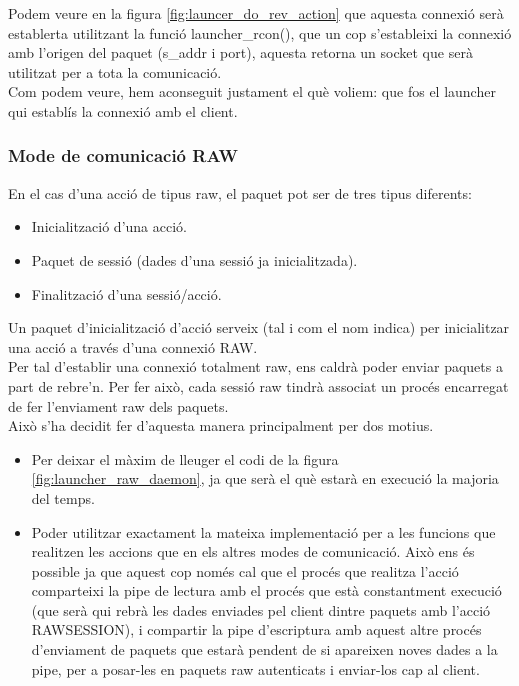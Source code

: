 Podem veure en la figura \ref{fig:launcer_do_rev_action} que aquesta connexió serà establerta utilitzant
la funció launcher\_rcon(), que un cop s'estableixi la connexió amb l'origen del paquet (s\_addr i port),
aquesta retorna un socket que serà utilitzat per a tota la comunicació. \\

Com podem veure, hem aconseguit justament el què voliem: que fos el launcher qui establís la connexió amb
el client.

\subsubsection{Mode de comunicació RAW}
En el cas d'una acció de tipus raw, el paquet pot ser de tres tipus diferents:
\begin{itemize}
\item Inicialització d'una acció.
\item Paquet de sessió (dades d'una sessió ja inicialitzada).
\item Finalització d'una sessió/acció.
\end{itemize}

Un paquet d'inicialització d'acció serveix (tal i com el nom indica) per inicialitzar una acció a través
d'una connexió RAW. \\

Per tal d'establir una connexió totalment raw, ens caldrà poder enviar paquets a part de rebre'n. Per fer 
això, cada sessió raw tindrà associat un procés encarregat de fer l'enviament raw dels paquets. \\

Això s'ha decidit fer d'aquesta manera principalment per dos motius.
\begin{itemize}
	\item Per deixar el màxim de lleuger el codi de la figura \ref{fig:launcher_raw_daemon}, ja que serà 
		el què estarà en execució la majoria del temps.
	\item Poder utilitzar exactament la mateixa implementació per a les funcions que realitzen les accions
	que en els altres modes de comunicació. Això ens és possible ja que aquest cop només cal que el procés 
	que realitza l'acció comparteixi la pipe de lectura amb el procés que està constantment execució (que 
	serà qui rebrà les dades enviades pel client dintre paquets amb l'acció RAWSESSION), i compartir la pipe 
	d'escriptura amb aquest altre procés d'enviament de paquets que estarà pendent de si apareixen noves 
	dades a la pipe, per a posar-les en paquets raw autenticats i enviar-los cap al client.
\end{itemize}

